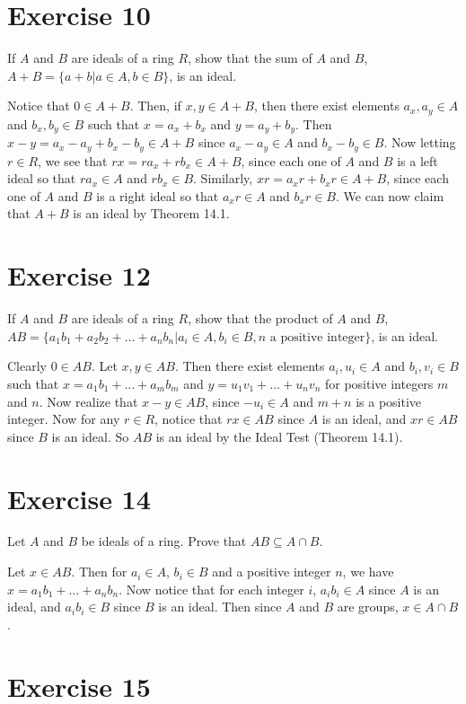 \documentclass[12pt]{article}
\begin{document}
\section*{Exercise 10}

If $A$ and $B$ are ideals of a ring $R$, show that the sum of $A$ and $B$,
$A+B=\{a+b|a\in A,b\in B\}$, is an ideal.

Notice that $0\in A+B$.  Then, if $x,y\in A+B$, then there exist
elements $a_x,a_y\in A$ and $b_x,b_y\in B$ such that
$x=a_x+b_x$ and $y=a_y+b_y$.  Then $x-y=a_x-a_y+b_x-b_y\in A+B$
since $a_x-a_y\in A$ and $b_x-b_y\in B$.  Now letting $r\in R$,
we see that $rx=ra_x+rb_x\in A+B$, since each one of $A$ and $B$
is a left ideal so that $ra_x\in A$ and $rb_x\in B$.
Similarly, $xr=a_xr+b_xr\in A+B$, since each one of $A$ and $B$
is a right ideal so that $a_xr\in A$ and $b_xr\in B$.  We can now claim
that $A+B$ is an ideal by Theorem 14.1.

\section*{Exercise 12}

If $A$ and $B$ are ideals of a ring $R$, show that the product of $A$ and $B$,
$AB=\{a_1b_1+a_2b_2+\dots+a_nb_n|a_i\in A, b_i\in B,\mbox{$n$ a positive integer}\}$,
is an ideal.

Clearly $0\in AB$.  Let $x,y\in AB$.  Then there exist elements $a_i,u_i\in A$
and $b_i,v_i\in B$ such that $x=a_1b_1+\dots+a_mb_m$ and
$y=u_1v_1+\dots+u_nv_n$ for positive integers $m$ and $n$.
Now realize that $x-y\in AB$, since $-u_i\in A$ and $m+n$ is a positive integer.
Now for any $r\in R$, notice that $rx\in AB$ since $A$ is an ideal, and
$xr\in AB$ since $B$ is an ideal.  So $AB$ is an ideal by the Ideal Test
(Theorem 14.1).

\section*{Exercise 14}

Let $A$ and $B$ be ideals of a ring.  Prove that $AB\subseteq A\cap B$.

Let $x\in AB$.  Then for $a_i\in A$, $b_i\in B$ and a positive integer $n$,
we have $x=a_1b_1+\dots+a_nb_n$.  Now notice that for each integer
$i$, $a_ib_i\in A$ since $A$ is an ideal, and $a_ib_i\in B$ since $B$ is an ideal.
Then since $A$ and $B$ are groups, $x\in A\cap B$.

\section*{Exercise 15}
\end{document}
